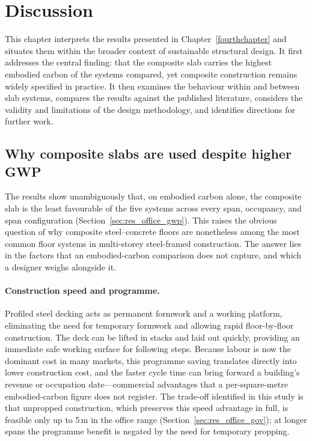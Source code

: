 \section{Discussion}
\label{fifthchapter}

This chapter interprets the results presented in Chapter~\ref{fourthchapter} and situates them within the broader context of sustainable structural design. It first addresses the central finding: that the composite slab carries the highest embodied carbon of the systems compared, yet composite construction remains widely specified in practice. It then examines the behaviour within and between slab systems, compares the results against the published literature, considers the validity and limitations of the design methodology, and identifies directions for further work.

\subsection{Why composite slabs are used despite higher GWP}
\label{sec:disc_why_composite}
The results show unambiguously that, on embodied carbon alone, the composite slab is the least favourable of the five systems across every span, occupancy, and span configuration (Section~\ref{sec:res_office_gwp}). This raises the obvious question of why composite steel--concrete floors are nonetheless among the most common floor systems in multi-storey steel-framed construction. The answer lies in the factors that an embodied-carbon comparison does not capture, and which a designer weighs alongside it.

\paragraph{Construction speed and programme.} Profiled steel decking acts as permanent formwork and a working platform, eliminating the need for temporary formwork and allowing rapid floor-by-floor construction. The deck can be lifted in stacks and laid out quickly, providing an immediate safe working surface for following steps. Because labour is now the dominant cost in many markets, this programme saving translates directly into lower construction cost, and the faster cycle time can bring forward a building's revenue or occupation date---commercial advantages that a per-square-metre embodied-carbon figure does not register. The trade-off identified in this study is that unpropped construction, which preserves this speed advantage in full, is feasible only up to 5\,m in the office range (Section~\ref{sec:res_office_gov}); at longer spans the programme benefit is negated by the need for temporary propping.

